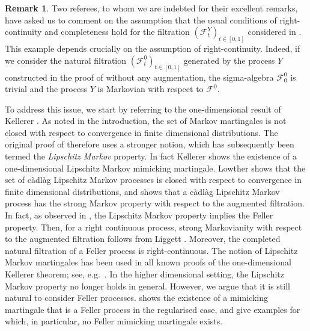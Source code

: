 \documentclass[12pt,oneside]{amsart}
\theoremstyle{definition}
\newtheorem{remark}[theorem]{Remark}
\newcommand{\F}{\mathcal F}
\numberwithin{equation}{section}
\begin{document}
\begin{remark}\label{rem:usual-conditions}
	Two referees, to whom we are indebted for their excellent remarks, have asked us to comment on the assumption that the usual conditions of right-continuity and completeness hold for the filtration $(\F^Y_t)_{t \in [0, 1]}$ considered in . This example depends crucially on the assumption of right-continuity. Indeed, if we consider the natural filtration $(\F^0_t)_{t \in [0, 1]}$ generated by the process $Y$ constructed in the proof of  without any augmentation, the sigma-algebra $\F^0_0$ is trivial and  the process $Y$ is Markovian with respect to $\F^0$.
		
	To address this issue, we start by referring to the one-dimensional result of Kellerer \cite{Ke72}. As noted in the introduction, the set of Markov martingales is not closed with respect to convergence in finite dimensional distributions. The original proof of \cite[Theorem 3]{Ke72} therefore uses a stronger notion, which has subsequently been termed the \emph{Lipschitz Markov} property. In fact Kellerer shows the existence of a one-dimensional Lipschitz Markov mimicking martingale. Lowther \cite[Lemma 4.5]{Lo09} shows that the set of c\`adl\`ag Lipschitz Markov processes is closed with respect to convergence in finite dimensional distributions, and \cite[Lemma 4.2]{Lo09} shows that a c\`adl\`ag Lipschitz Markov process has the strong Markov property with respect to the augmented filtration. In fact, as observed in \cite[Section 3.3]{BeHuSt16}, the Lipschitz Markov property implies the Feller property. Then, for a right continuous process, strong Markovianity with respect to the augmented filtration follows from Liggett \cite[Theorem 3.3]{Li10}. Moreover, the completed natural filtration of a Feller process is right-continuous. The notion of Lipschitz Markov martingales has been used in all known proofs of the one-dimensional Kellerer theorem; see, e.g.~\cite{BeHuSt16,HiRoYo14}. In the higher dimensional setting, the Lipschitz Markov property no longer holds in general. However, we argue that it is still natural to consider Feller processes.  shows the existence of a mimicking martingale that is a Feller process in the regularised case, and  give examples for which, in particular, no Feller mimicking martingale exists.
	

\end{remark}
\end{document}

